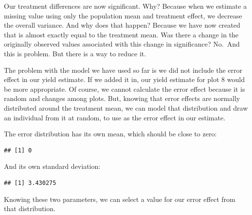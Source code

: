 \documentclass[
]{book}
\newenvironment{Shaded}{\begin{snugshade}}{\end{snugshade}}
\newcommand{\AttributeTok}[1]{\textcolor[rgb]{0.77,0.63,0.00}{#1}}
\newcommand{\ConstantTok}[1]{\textcolor[rgb]{0.00,0.00,0.00}{#1}}
\newcommand{\FunctionTok}[1]{\textcolor[rgb]{0.00,0.00,0.00}{#1}}
\newcommand{\NormalTok}[1]{#1}
\newcommand{\OtherTok}[1]{\textcolor[rgb]{0.56,0.35,0.01}{#1}}
\newcommand{\SpecialCharTok}[1]{\textcolor[rgb]{0.00,0.00,0.00}{#1}}
\begin{document}
Our treatment differences are now significant. Why? Because when we estimate a missing value using only the population mean and treatment effect, we decrease the overall variance. And why does that happen? Because we have now created that is almost exactly equal to the treatment mean. Was there a change in the originally observed values associated with this change in significance? No.~And this is problem. But there is a way to reduce it.

The problem with the model we have used so far is we did not include the error effect in our yield estimate. If we added it in, our yield estimate for plot 8 would be more appropriate. Of course, we cannot calculate the error effect because it is random and changes among plots. But, knowing that error effects are normally distributed around the treatment mean, we can model that distribution and draw an individual from it at random, to use as the error effect in our estimate.

The error distribution has its own mean, which should be close to zero:

\begin{Shaded}
\end{Shaded}

\begin{verbatim}
## [1] 0
\end{verbatim}

And its own standard deviation:

\begin{Shaded}
\end{Shaded}

\begin{verbatim}
## [1] 3.430275
\end{verbatim}

Knowing these two parameters, we can select a value for our error effect from that distribution.
\end{document}
